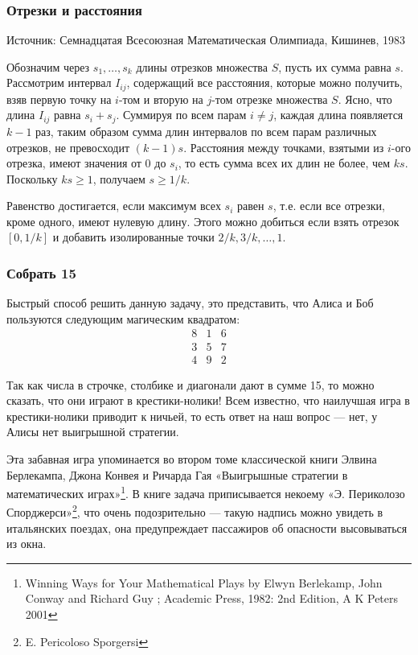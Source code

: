 \subsubsection*{Отрезки и расстояния} %


Источник:  Семнадцатая Всесоюзная Математическая Олимпиада,  Кишинев, 1983


Обозначим через $s_1,\dots,s_k$ длины отрезков множества $S$,
пусть их сумма равна $s$.
Рассмотрим интервал $I_{ij}$, содержащий все расстояния, которые можно получить, взяв первую точку на $i$-том  и вторую на $j$-том  отрезке множества $S$. 
Ясно, что  длина  $I_{ij}$ равна $s_i+s_j$. 
Суммируя по всем парам $i\ne j$, 
каждая длина  появляется $k-1$ раз,
таким образом сумма длин интервалов по всем парам различных отрезков,  не превосходит $(k-1) s$.
Расстояния между точками, взятыми из $i$-ого отрезка, имеют значения от $0$ до $s_i$, то есть сумма всех их длин не более, чем $k s$.
Поскольку $k s\ge 1$, получаем $s\ge 1/k$. \heart


Равенство достигается, если максимум всех $s_i$ равен $s$, 
т.е. если все отрезки, кроме одного, имеют нулевую длину. 
Этого можно добиться если взять отрезок $[0,1/k]$ и добавить изолированные точки
$2/k,3/k,\dots,1$.



\subsubsection*{Собрать 15} %



Быстрый способ решить данную задачу,  это представить, что Алиса и Боб пользуются следующим магическим квадратом:
$$
\begin{matrix}
8&1&6\\
3&5&7\\
4&9&2
\end{matrix}
$$

Так как числа в строчке, столбике и диагонали дают в сумме 15, то можно сказать, что они играют в крестики-нолики!  
Всем известно, что наилучшая игра в крестики-нолики приводит к ничьей,
то есть ответ на наш вопрос --- нет, у Алисы нет выигрышной стратегии.


Эта забавная игра упоминается во втором томе классической книги Элвина Берлекампа,  Джона Конвея и Ричарда Гая  «Выигрышные стратегии в математических играх»\footnote{Winning Ways for Your Mathematical Plays  by Elwyn Berlekamp, John Conway and Richard Guy ;   Academic Press, 1982: 2nd Edition, A K Peters 2001}. В книге  задача приписывается некоему «Э. Периколозо Спорджерси»\footnote{E. Pericoloso Sporgersi}, что очень подозрительно ---
такую надпись
можно увидеть в итальянских поездах, она предупреждает пассажиров об опасности высовываться из окна.